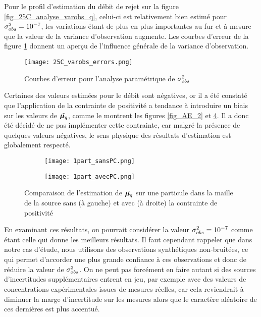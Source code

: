          Pour le profil d'estimation {du débit de rejet} sur la figure \ref{fig_25C_analyse_varobs_q}, celui-ci est relativement bien estimé pour ${\sigma_{obs}^2}=10^{-7}$, les variations étant de plus en plus importantes au fur et à mesure que la valeur de la variance d'observation augmente. Les courbes d'erreur de la figure \ref{fig_25C_varobs_erreurs} donnent un aperçu de l'influence générale de la variance d'observation.
         
         \begin{figure}[h!]
         	\centering
         	\texttt{[image: 25C\_varobs\_errors.png]}
         	\caption{Courbes d'erreur pour l'analyse paramétrique de ${\sigma_{obs}^2}$}
         	\label{fig_25C_varobs_erreurs}
         \end{figure}
         
         
         Certaines des valeurs estimées pour le débit {sont} négatives, or il a été constaté que l'application de la contrainte de positivité a tendance à {introduire un biais sur les valeurs de $\tilde{{\bm{\mu}_q}}$, comme le montrent les figures \ref{fig_AE_2} et \ref{fig_sansavecPC}.} Il a donc été décidé de ne pas implémenter cette contrainte, car malgré la présence de quelques valeurs négatives, le sens physique des résultats d'estimation est globalement respecté.
       
\begin{figure}[h!]
    	\centering
         	\begin{subfigure}[t]{0.5\textwidth}
         		\centering
         		\texttt{[image: 1part\_sansPC.png]}
         		\caption{}
         		\label{sansPC}
         	\end{subfigure}%
         	\begin{subfigure}[t]{0.5\textwidth}
         		\centering
         		\texttt{[image: 1part\_avecPC.png]}
         		\caption{}
         		\label{avecPC}
         	\end{subfigure}
         	\caption{Comparaison de l'estimation de $\tilde{{\bm{\mu}_q}}$ sur une particule dans la maille de la source sans (à gauche) et avec (à droite) la contrainte de positivité}
         	\label{fig_sansavecPC}
         \end{figure}

En examinant ces résultats, on pourrait considérer la valeur ${\sigma_{obs}^2} = 10^{-7}$ comme étant celle qui donne les meilleurs résultats. Il faut cependant rappeler que dans notre cas d'étude, nous utilisons des observations synthétiques non-bruitées, ce qui permet d'accorder une plus grande confiance à ces observations et donc de réduire la valeur de ${\sigma_{obs}^2}$. On ne peut pas forcément en faire autant si des sources d'incertitudes supplémentaires entrent en jeu, par exemple avec des valeurs de concentrations expérimentales issues de mesures réelles, car cela reviendrait à diminuer la marge d'incertitude sur les mesures alors que le caractère aléatoire de ces dernières est plus accentué. 

